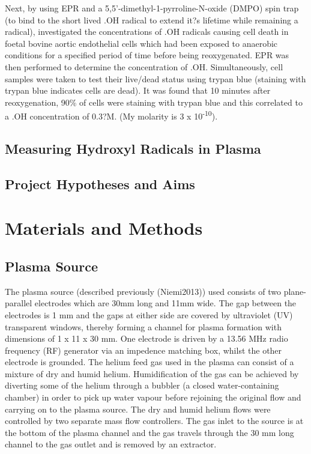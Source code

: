 \documentclass[11pt, oneside]{article}   	%
\begin{document}
Next, by using EPR and a 5,5'-dimethyl-1-pyrroline-N-oxide (DMPO) spin trap (to bind to the short lived .OH radical to extend it?s lifetime while remaining a radical), \cite{Zweier1988} investigated the concentrations of .OH radicals causing cell death in foetal bovine aortic endothelial cells which had been exposed to anaerobic conditions for a specified period of time before being reoxygenated. EPR was then performed to determine the concentration of .OH. Simultaneously, cell samples were taken to test their live/dead status using trypan blue (staining with trypan blue indicates cells are dead). It was found that 10 minutes after reoxygenation, 90\% of cells were staining with trypan blue and this correlated to a .OH concentration of 0.3?M. (My molarity is 3 x 10\textsuperscript{-10}).

\subsection{Measuring Hydroxyl Radicals in Plasma}



\subsection{Project Hypotheses and Aims}


\section{Materials and Methods}

\subsection{Plasma Source}
The plasma source (described previously (Niemi2013)) used consists of two plane-parallel electrodes which are 30mm long and 11mm wide. 
The gap between the electrodes is 1 mm and the gaps at either side are covered by ultraviolet (UV) transparent windows, thereby forming a channel for plasma formation with dimensions of 1 x 11 x 30 mm.
One electrode is driven by a 13.56 MHz radio frequency (RF) generator via an impedence matching box, whilst the other electrode is grounded. 
The helium feed gas used in the plasma can consist of a mixture of dry and humid helium. Humidification of the gas can be achieved by diverting some of the helium through a bubbler (a closed water-containing chamber) in order to pick up water vapour before rejoining the original flow and carrying on to the plasma source.
The dry and humid helium flows were controlled by two separate mass flow controllers.
The gas inlet to the source is at the bottom of the plasma channel and the gas travels through the 30 mm long channel to the gas outlet and is removed by an extractor.
\end{document}
